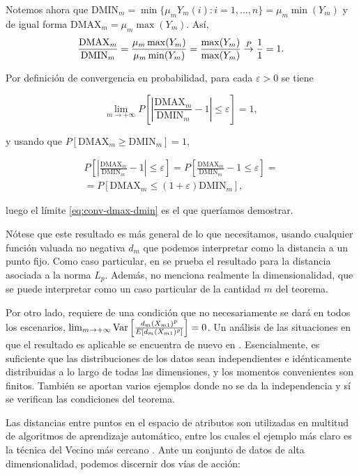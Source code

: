Notemos ahora que
\(\mathrm{DMIN}_m= \min\{\mu_m Y_m(i):i=1,\dots,n\}=\mu_m \min(Y_m)\) y
de igual forma \(\mathrm{DMAX}_m=\mu_m \max(Y_m)\). Así,
\[ \frac{\mathrm{DMAX}_m}{\mathrm{DMIN}_m}=\frac{\mu_m \max(Y_m)}{\mu_m \min(Y_m)}=\frac{\max(Y_m)}{\max(Y_m)}\overset{P}{\rightarrow} \frac 1 1= 1.\]

Por definición de convergencia en probabilidad, para cada
\(\varepsilon>0\) se tiene

\begin{equation}
  \label{eq:conv-dmax-dmin}
  \lim_{m\rightarrow +\infty} P\left[\left\lvert \frac{\mathrm{DMAX}_m}{\mathrm{DMIN}_m} - 1 \right\rvert\leq\varepsilon\right] = 1,
  \end{equation}

y usando que \(P\left[\mathrm{DMAX}_m \geq \mathrm{DMIN}_m \right]=1\),

\begin{gather*}
  P\left[\left\lvert \frac{\mathrm{DMAX}_m}{\mathrm{DMIN}_m} - 1 \right\rvert\leq\varepsilon\right]=
P\left[\frac{\mathrm{DMAX}_m}{\mathrm{DMIN}_m} - 1 \leq\varepsilon\right]=\\=
P\left[\mathrm{DMAX}_m\leq (1+ \varepsilon)\mathrm{DMIN}_m \right],
\end{gather*}

luego el límite \eqref{eq:conv-dmax-dmin} es el que queríamos demostrar.
\proofe
\theoe

Nótese que este resultado es más general de lo que necesitamos, usando
cualquier función valuada no negativa \(d_m\) que podemos interpretar
como la distancia a un punto fijo. Como caso particular, en
\textcite{aggarwal2001} se prueba el resultado para la distancia
asociada a la norma \(L_p\). Además, no menciona realmente la
dimensionalidad, que se puede interpretar como un caso particular de la
cantidad \(m\) del teorema.

Por otro lado, requiere de una condición que no necesariamente se dará
en todos los escenarios,
\(\lim_{m\rightarrow +\infty}\mathrm{Var}\left[\frac{d_m(X_{m1})^p}{E[d_m(X_{m1})^p]}\right]=0\).
Un análisis de las situaciones en que el resultado es aplicable se
encuentra de nuevo en \textcite{beyer1999}. Esencialmente, es suficiente
que las distribuciones de los datos sean independientes e idénticamente
distribuidas a lo largo de todas las dimensiones, y los momentos
convenientes son finitos. También se aportan varios ejemplos donde no se
da la independencia y sí se verifican las condiciones del teorema.

Las distancias entre puntos en el espacio de atributos son utilizadas en
multitud de algoritmos de aprendizaje automático, entre los cuales el
ejemplo más claro es la técnica del Vecino más cercano
\autocite{peterson2009}. Ante un conjunto de datos de alta
dimensionalidad, podemos discernir dos vías de acción:

